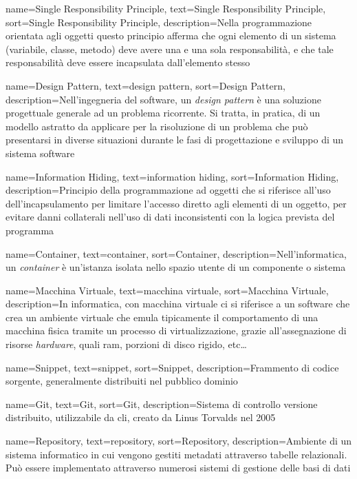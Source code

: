 {
    name=Single Responsibility Principle,
    text=Single Responsibility Principle,
    sort=Single Responsibility Principle,
    description={Nella programmazione orientata agli oggetti questo principio afferma che ogni elemento di un sistema (variabile, classe, metodo) deve avere una e una sola responsabilità, e che tale responsabilità deve essere incapsulata dall'elemento stesso}
}

{
    name=Design Pattern,
    text=design pattern,
    sort=Design Pattern,
    description={Nell'ingegneria del software, un \emph{design pattern} è una soluzione progettuale generale ad un problema ricorrente. Si tratta, in pratica, di un modello astratto da applicare per la risoluzione di un problema che può presentarsi in diverse situazioni durante le fasi di progettazione e sviluppo di un sistema software}
}

{
    name=Information Hiding,
    text=information hiding,
    sort=Information Hiding,
    description={Principio della programmazione ad oggetti che si riferisce all'uso dell'incapsulamento per limitare l'accesso diretto agli elementi di un oggetto, per evitare danni collaterali nell'uso di dati inconsistenti con la logica prevista del programma}
}

{
    name=Container,
    text=container,
    sort=Container,
    description={Nell'informatica, un \emph{container} è un'istanza isolata nello spazio utente di un componente o sistema}
}

{
    name=Macchina Virtuale,
    text=macchina virtuale,
    sort=Macchina Virtuale,
    description={In informatica, con macchina virtuale ci si riferisce a un software che crea un ambiente virtuale che emula tipicamente il comportamento di una macchina fisica tramite un processo di virtualizzazione, grazie all'assegnazione di risorse \emph{hardware}, quali \gls{ram}, porzioni di disco rigido, etc\dots }
}

{
    name=Snippet,
    text=snippet,
    sort=Snippet,
    description={Frammento di codice sorgente, generalmente distribuiti nel pubblico dominio}
}

{
    name=Git,
    text=Git,
    sort=Git,
    description={Sistema di controllo versione distribuito, utilizzabile da \gls{cli}, creato da Linus Torvalds nel 2005}
}

{
    name=Repository,
    text=repository,
    sort=Repository,
    description={Ambiente di un sistema informatico in cui vengono gestiti metadati attraverso tabelle relazionali. Può essere implementato attraverso numerosi sistemi di gestione delle basi di dati}
}

